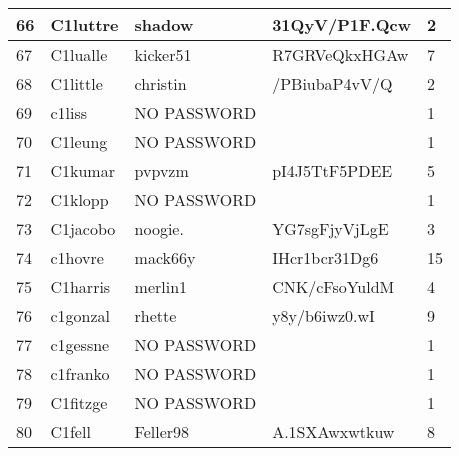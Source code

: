 \documentclass[11pt]{article} %
\begin{document}
\begin{tabular}{|p{0.5cm}|p{3.1cm}|p{3.1cm}|p{3.3cm}|p{1.7cm}|}
66 & C1luttre & shadow & 31QyV/P1F.Qcw & 2\\ \hline
67 & C1lualle & kicker51 & R7GRVeQkxHGAw & 7\\ \hline
68 & C1little & christin & /PBiubaP4vV/Q & 2\\ \hline
69 & c1liss & NO PASSWORD &  & 1\\ \hline
70 & C1leung & NO PASSWORD & & 1\\ \hline
71 & C1kumar & pvpvzm & pI4J5TtF5PDEE &  5\\ \hline
72 & C1klopp & NO PASSWORD &  & 1\\ \hline
73 & C1jacobo & noogie.	& YG7sgFjyVjLgE & 3 \\ \hline
74 & c1hovre & mack66y & IHcr1bcr31Dg6 & 15 \\ \hline
75 & C1harris & merlin1 & CNK/cFsoYuldM & 4 \\ \hline
76 & c1gonzal & rhette & y8y/b6iwz0.wI & 9\\ \hline
77 & c1gessne & NO PASSWORD & & 1\\ \hline
78 & c1franko & NO PASSWORD & & 1\\ \hline
79 & C1fitzge & NO PASSWORD &  & 1\\ \hline
80 & C1fell	& Feller98 & A.1SXAwxwtkuw & 8\\ \hline
\end{tabular}
\end{document}
